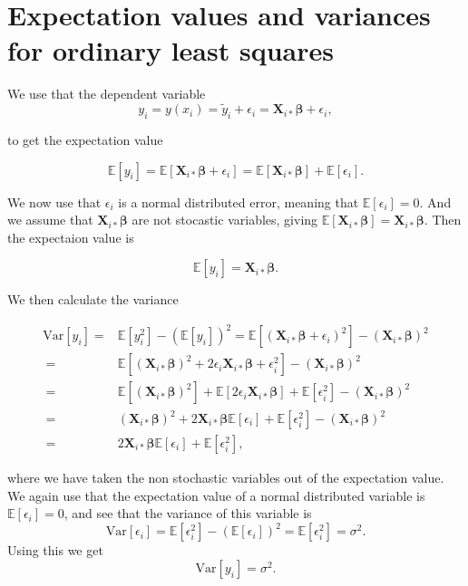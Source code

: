 \appendix
\section{Expectation values and variances for ordinary least squares}\label{app:ols_expactation_variance}

We use that the dependent variable
$$
y_i = y(x_i) = \tilde{y}_i + \epsilon_i = \mathbf X_{i*}\boldsymbol{\beta} + \epsilon_i,
$$

to get the expectation value



$$
\mathbb{E}[y_i] = \mathbb{E}[\mathbf X_{i*}\boldsymbol{\beta} + \epsilon_i] = \mathbb{E}[\mathbf X_{i*}\boldsymbol{\beta}] + \mathbb{E}[\epsilon_i].
$$

We now use that $\epsilon_i$ is a normal distributed error, meaning that $\mathbb{E}[\epsilon_i]=0$. And we assume that $\mathbf X_{i*}\boldsymbol{\beta}$ are not stocastic variables, giving $\mathbb{E}[\mathbf X_{i*}\boldsymbol{\beta}]=\mathbf X_{i*}\boldsymbol{\beta}$. Then the expectaion value is

\begin{equation}\label{eq:expectation_yi}
\mathbb{E}[y_i] = \mathbf X_{i*}\boldsymbol{\beta}.
\end{equation}

We then calculate the variance


\begin{align*}
\mbox{Var}[y_i] =& \mathbb{E}[y_i^2] - (\mathbb{E}[y_i])^2 = \mathbb{E}[(\mathbf X_{i*}\boldsymbol{\beta} + \epsilon_i)^2]- (\mathbf X_{i*}\boldsymbol{\beta})^2
\\
\ =& \mathbb{E}[(\mathbf X_{i*}\boldsymbol{\beta})^2+2\epsilon_i \mathbf X_{i*}\boldsymbol{\beta}+\epsilon_i^2]-(\mathbf X_{i*}\boldsymbol{\beta})^2
\\
\ =& \mathbb{E}[(\mathbf X_{i*}\boldsymbol{\beta})^2] + \mathbb{E}[2\epsilon_i \mathbf X_{i*}\boldsymbol{\beta}] + \mathbb{E}[\epsilon_i^2]-(\mathbf X_{i*}\boldsymbol{\beta})^2
\\
\ =& (\mathbf X_{i*}\boldsymbol{\beta})^2 + 2\mathbf X_{i*}\boldsymbol{\beta}\mathbb{E}[\epsilon_i ] + \mathbb{E}[\epsilon_i^2]-(\mathbf X_{i*}\boldsymbol{\beta})^2
\\
\ =& 2\mathbf X_{i*}\boldsymbol{\beta}\mathbb{E}[\epsilon_i ] + \mathbb{E}[\epsilon_i^2],
\end{align*}


where we have taken the non stochastic variables out of the expectation value. We again use that the expectation value of a normal distributed variable is $\mathbb{E}[\epsilon_i ]=0$, and see that the variance of this variable is
$$
\mbox{Var}[\epsilon_i]=\mathbb{E}[\epsilon_i^2 ]-(\mathbb{E}[\epsilon_i ])^2=\mathbb{E}[\epsilon_i^2 ]=\sigma^2.
$$
Using this we get
\begin{equation}\label{eq:var_yi}
\mbox{Var}[y_i] = \sigma^2.
\end{equation}



